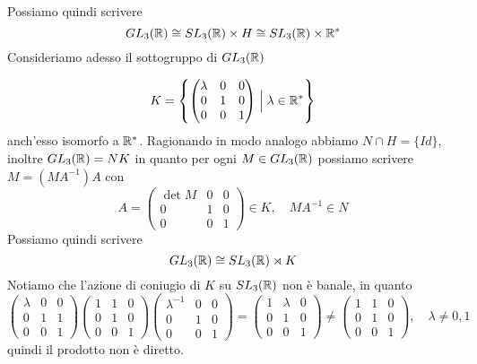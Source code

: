 \documentclass[11pt]{scrartcl}
\begin{document}
Possiamo quindi scrivere 
\[
    GL_3(\mathbb R) \cong SL_3(\mathbb R) \times H \cong SL_3(\mathbb R)\times \mathbb R^*
\]
Consideriamo adesso il sottogruppo di $GL_3(\mathbb R)$

\[
    K = \left\{\begin{pmatrix}
        \lambda & 0 & 0\\
        0 & 1 & 0\\
        0 & 0 & 1
    \end{pmatrix}\Bigm| \lambda \in \mathbb R^* \right\}
\]
anch'esso isomorfo a $\mathbb R^*$. Ragionando in modo analogo abbiamo $N \cap H = \{Id\}$, 
inoltre $GL_3(\mathbb R) = NK$ in quanto per ogni $M \in GL_3(\mathbb R)$ possiamo scrivere
$M = (MA^{-1})A$ con 
\[
    A = \begin{pmatrix}
        \det M & 0 & 0\\
        0 & 1 & 0\\
        0 & 0 & 1
    \end{pmatrix} \in K, \quad MA^{-1} \in N
\]
Possiamo quindi scrivere 
\[
    GL_3(\mathbb R) \cong SL_3(\mathbb R)\rtimes K
\]
Notiamo che l'azione di coniugio di $K$ su $SL_3(\mathbb R)$ non è banale, in 
quanto
\[
    \begin{pmatrix}
        \lambda & 0 & 0\\
        0 & 1 & 1\\
        0 & 0 & 1
    \end{pmatrix}
    \begin{pmatrix}
        1 & 1 & 0\\
        0 & 1 & 0\\
        0 & 0 & 1
    \end{pmatrix}
    \begin{pmatrix}
        \lambda^{-1}& 0 & 0\\
        0 & 1 & 0\\
        0 & 0 & 1
    \end{pmatrix} = 
    \begin{pmatrix}
        1 & \lambda & 0\\
        0 & 1 & 0\\
        0 & 0 & 1
    \end{pmatrix} \neq \begin{pmatrix}
        1 & 1 & 0\\
        0 & 1 & 0\\
        0 & 0 & 1
    \end{pmatrix},\quad \lambda \neq 0, 1
\]
quindi il prodotto non è diretto.\newline
\end{document}
